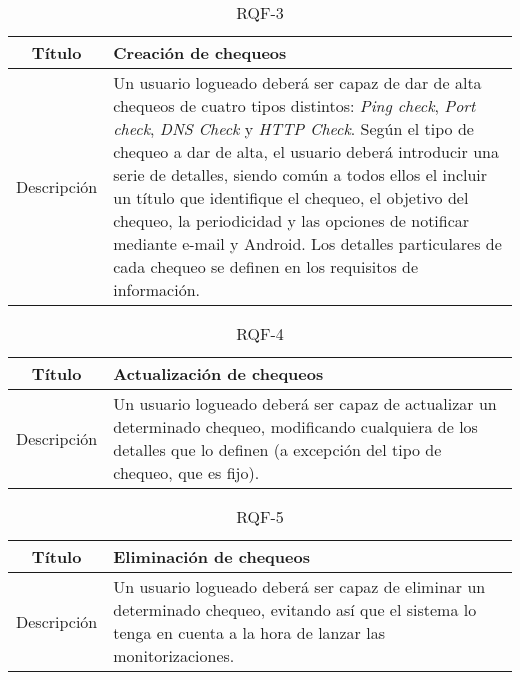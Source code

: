 \begin{table}[h!]
  \centering
  \begin{tabularx}{\textwidth}{|c|X|}
    \hline
    Título & Creación de chequeos \\

    \hline

    Descripción & Un usuario logueado deberá ser capaz de dar de alta chequeos
    de cuatro tipos distintos: \textit{Ping check}, \textit{Port check},
    \textit{DNS Check} y \textit{HTTP Check}. Según el tipo de chequeo a dar de
    alta, el usuario deberá introducir una serie de detalles, siendo común a
    todos ellos el incluir un título que identifique el chequeo, el objetivo del
    chequeo, la periodicidad y las opciones de notificar mediante e-mail y
    Android.  Los detalles particulares de cada chequeo se definen en los
    requisitos de información. \\

    \hline
  \end{tabularx}
  \caption{RQF-3}
\end{table}


\begin{table}[h!]
  \centering
  \begin{tabularx}{\textwidth}{|c|X|}
    \hline
    Título & Actualización de chequeos \\

    \hline

    Descripción & Un usuario logueado deberá ser capaz de actualizar un
    determinado chequeo, modificando cualquiera de los detalles que lo definen
    (a excepción del tipo de chequeo, que es fijo). \\

    \hline
  \end{tabularx}
  \caption{RQF-4}
\end{table}

\begin{table}[h!]
  \centering
  \begin{tabularx}{\textwidth}{|c|X|}
    \hline
    Título & Eliminación de chequeos \\

    \hline

    Descripción & Un usuario logueado deberá ser capaz de eliminar un
    determinado chequeo, evitando así que el sistema lo tenga en cuenta a la
    hora de lanzar las monitorizaciones. \\

    \hline
  \end{tabularx}
  \caption{RQF-5}
\end{table}





